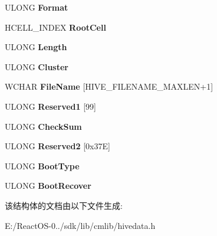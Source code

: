 \begin{DoxyCompactItemize}
U\+L\+O\+NG {\bfseries Format}
\item 
\mbox{\label{struct___h_b_a_s_e___b_l_o_c_k_a2a0149a20df0515f726913b9618d4621}} 
H\+C\+E\+L\+L\+\_\+\+I\+N\+D\+EX {\bfseries Root\+Cell}
\item 
\mbox{\label{struct___h_b_a_s_e___b_l_o_c_k_a1c789e314be6efd15d07cfbf316f27a4}} 
U\+L\+O\+NG {\bfseries Length}
\item 
\mbox{\label{struct___h_b_a_s_e___b_l_o_c_k_afb0a4ba52573dca35e2bd098fb3c37bb}} 
U\+L\+O\+NG {\bfseries Cluster}
\item 
\mbox{\label{struct___h_b_a_s_e___b_l_o_c_k_a746740a0e4b8aae842c10dfddd859277}} 
W\+C\+H\+AR {\bfseries File\+Name} \mbox{[}H\+I\+V\+E\+\_\+\+F\+I\+L\+E\+N\+A\+M\+E\+\_\+\+M\+A\+X\+L\+EN+1\mbox{]}
\item 
\mbox{\label{struct___h_b_a_s_e___b_l_o_c_k_a2e206c186af87453828c8083e8f593d4}} 
U\+L\+O\+NG {\bfseries Reserved1} \mbox{[}99\mbox{]}
\item 
\mbox{\label{struct___h_b_a_s_e___b_l_o_c_k_aba470770a97efb2bdd37adc9196c74d0}} 
U\+L\+O\+NG {\bfseries Check\+Sum}
\item 
\mbox{\label{struct___h_b_a_s_e___b_l_o_c_k_a3052fcf39ed7a211df8e8404b1abe361}} 
U\+L\+O\+NG {\bfseries Reserved2} \mbox{[}0x37\+E\mbox{]}
\item 
\mbox{\label{struct___h_b_a_s_e___b_l_o_c_k_a027bf308081140ce2c700c41d46937af}} 
U\+L\+O\+NG {\bfseries Boot\+Type}
\item 
\mbox{\label{struct___h_b_a_s_e___b_l_o_c_k_a84180f0325d0bbbd0eba337a203b8902}} 
U\+L\+O\+NG {\bfseries Boot\+Recover}
\end{DoxyCompactItemize}


该结构体的文档由以下文件生成\+:\begin{DoxyCompactItemize}
\item 
E\+:/\+React\+O\+S-\/0../sdk/lib/cmlib/hivedata.\+h\end{DoxyCompactItemize}
